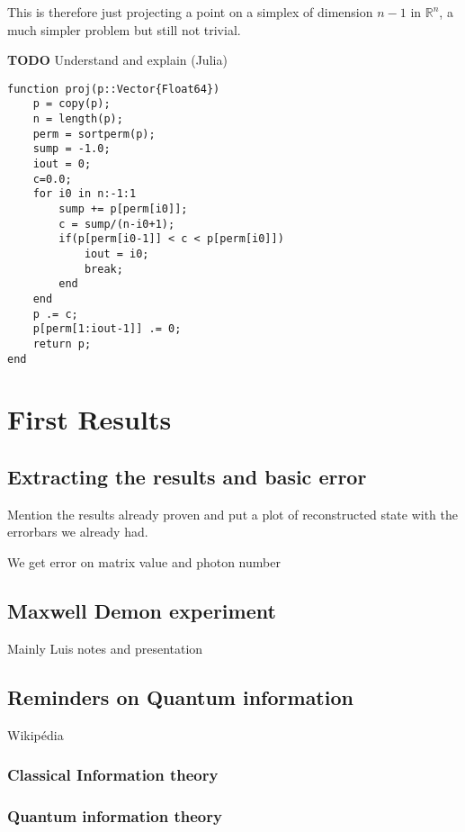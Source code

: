 \documentclass[10pt]{report}
\theoremstyle{plain}
\theoremstyle{definition}
\theoremstyle{remark}
\newcommand{\R}{\ensuremath{\mathbb{R}}}
\newcommand{\TODO}{\textbf{TODO}}
\begin{document}
This is therefore just projecting a point on a simplex of dimension $n-1$ in
$\R^n$, a much simpler problem but still not trivial.

\TODO{} Understand and explain (Julia)

\begin{verbatim}
function proj(p::Vector{Float64})
    p = copy(p);
    n = length(p);
    perm = sortperm(p);
    sump = -1.0;
    iout = 0;
    c=0.0;
    for i0 in n:-1:1
        sump += p[perm[i0]];
        c = sump/(n-i0+1);
        if(p[perm[i0-1]] < c < p[perm[i0]])
            iout = i0;
            break;
        end
    end
    p .= c;
    p[perm[1:iout-1]] .= 0;
    return p;
end

\end{verbatim}



\chapter{First Results}
\section{Extracting the results and basic error}

Mention the results already proven and put a plot of reconstructed state with
the errorbars we already had.

We get error on matrix value and photon number

\section{Maxwell Demon experiment}

Mainly Luis notes and presentation


\section{Reminders on Quantum information}

Wikipédia

\subsection{Classical Information theory}

\subsection{Quantum information theory}
\end{document}
